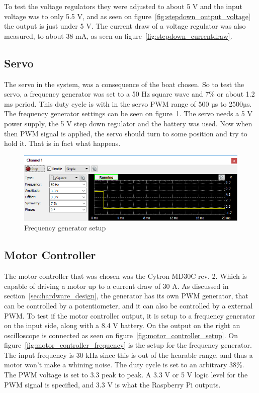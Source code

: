 To test the voltage regulators they were adjusted to about 5 V and the input voltage was to only 5.5 V, and as seen on figure~\ref{fig:stepdown_output_voltage} the output is just under 5 V.  The current draw of a voltage regulator was also measured, to about 38 mA, as seen on figure~\ref{fig:stepdown_currentdraw}.

\subsection{Servo}
The servo in the system, was a consequence of the boat chosen.  So to test the servo, a frequency generator was set to a 50 Hz square wave and 7\% or about 1.2 ms period. This duty cycle is with in the servo PWM range of 500 µs to 2500µs. The frequency generator settings can be seen on figure~\ref{fig:servopwmtest}. The servo needs a 5 V power supply, the 5 V step down regulator and the battery was used. Now when then PWM signal is applied, the servo should turn to some position and try to hold it. That is in fact what happens. 

\begin{figure}[h]
\centering
\includegraphics[width=0.7\linewidth]{Images/Implementation/Servo_PWM_test}
\caption{Frequency generator setup}
\label{fig:servopwmtest}
\end{figure}

\subsection{Motor Controller}
\label{sec:motor_controller}
The motor controller that was chosen was the Cytron MD30C rev. 2. Which is capable of driving a motor up to a current draw of 30 A. As discussed in section~\ref{sec:hardware_design}, the generator has its own PWM generator, that can be controlled by a potentiometer, and it can also be controlled by a external PWM. To test if the motor controller output, it is setup to a frequency generator on the input side, along with a 8.4 V battery. On the output on the right an oscilloscope is connected as seen on figure~\ref{fig:motor_controller_setup}. On figure~\ref{fig:motor_controller_frequency} is the setup for the frequency generator. The input frequency is 30 kHz since this is out of the hearable range, and thus a motor won't make a whining noise. The duty cycle is set to an arbitrary 38\%. The PWM voltage is set to 3.3 peak to peak. A 3.3 V or 5 V logic level for the PWM signal is specified, and 3.3 V is what the Raspberry Pi outputs. 

